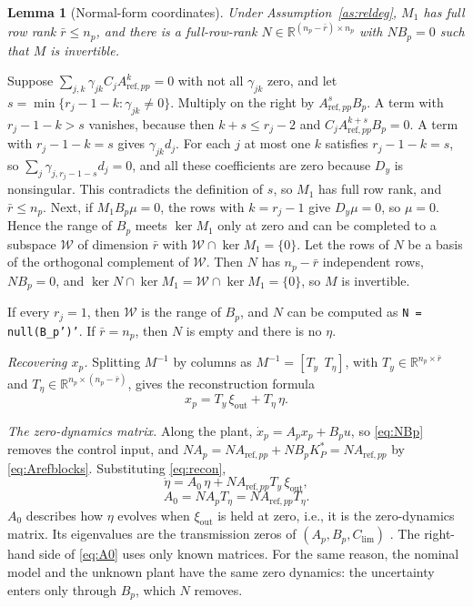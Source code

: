 \documentclass[lettersize,journal]{IEEEtran}
\newtheorem{lemma}{Lemma}
\newcommand{\App}{A_{\mathrm{ref},pp}}
\newcommand{\Clim}{C_{\mathrm{lim}}}
\newcommand{\R}{\mathbb{R}}
\begin{document}
\begin{lemma}[Normal-form coordinates] \label{lem:nf}
Under Assumption~\ref{as:reldeg}, $M_1$ has full row rank $\bar r\le n_p$, and there is a full-row-rank $N\in\R^{(n_p-\bar r)\times n_p}$ with $NB_p=0$ such that $M$ is invertible.
\end{lemma}
\begin{IEEEproof}
Suppose $\sum_{j,k}\gamma_{jk}C_j\App^k=0$ with not all $\gamma_{jk}$ zero, and let $s=\min\{r_j-1-k:\gamma_{jk}\ne0\}$. Multiply on the right by $\App^sB_p$. A term with $r_j-1-k>s$ vanishes, because then $k+s\le r_j-2$ and $C_j\App^{k+s}B_p=0$. A term with $r_j-1-k=s$ gives $\gamma_{jk}d_j$. For each $j$ at most one $k$ satisfies $r_j-1-k=s$, so $\sum_j\gamma_{j,r_j-1-s}d_j=0$, and all these coefficients are zero because $D_y$ is nonsingular. This contradicts the definition of $s$, so $M_1$ has full row rank, and $\bar r\le n_p$. Next, if $M_1B_p\mu=0$, the rows with $k=r_j-1$ give $D_y\mu=0$, so $\mu=0$. Hence the range of $B_p$ meets $\ker M_1$ only at zero and can be completed to a subspace $\mathcal{W}$ of dimension $\bar r$ with $\mathcal{W}\cap\ker M_1=\{0\}$. Let the rows of $N$ be a basis of the orthogonal complement of $\mathcal{W}$. Then $N$ has $n_p-\bar r$ independent rows, $NB_p=0$, and $\ker N\cap\ker M_1=\mathcal{W}\cap\ker M_1=\{0\}$, so $M$ is invertible.
\end{IEEEproof}

If every $r_j=1$, then $\mathcal{W}$ is the range of $B_p$, and $N$ can be computed as \texttt{N = null(B\_p')'}. If $\bar r=n_p$, then $N$ is empty and there is no $\eta$.

\emph{Recovering $x_p$.} Splitting $M^{-1}$ by columns as $M^{-1}=[T_y\ \ T_\eta]$, with $T_y\in\R^{n_p\times\bar r}$ and $T_\eta\in\R^{n_p\times(n_p-\bar r)}$, gives the reconstruction formula
\begin{equation}
x_p = T_y\,\xi_{\mathrm{out}} + T_\eta\,\eta. \label{eq:recon}
\end{equation}

\emph{The zero-dynamics matrix.} Along the plant, $\dot x_p=A_px_p+B_pu$, so \eqref{eq:NBp} removes the control input, and $NA_p=N\App+NB_pK_P^*=N\App$ by \eqref{eq:Arefblocks}. Substituting \eqref{eq:recon},
\begin{equation}
\dot\eta = A_0\,\eta + N\App T_y\,\xi_{\mathrm{out}}, \label{eq:etaplant}
\end{equation}
\begin{equation}
A_0 = NA_pT_\eta = N\App T_\eta. \label{eq:A0}
\end{equation}
$A_0$ describes how $\eta$ evolves when $\xi_{\mathrm{out}}$ is held at zero, i.e., it is the zero-dynamics matrix. Its eigenvalues are the transmission zeros of $(A_p,B_p,\Clim)$ \cite[Sec.~5.1]{isidori1995}. The right-hand side of \eqref{eq:A0} uses only known matrices. For the same reason, the nominal model and the unknown plant have the same zero dynamics: the uncertainty enters only through $B_p$, which $N$ removes.
\end{document}
